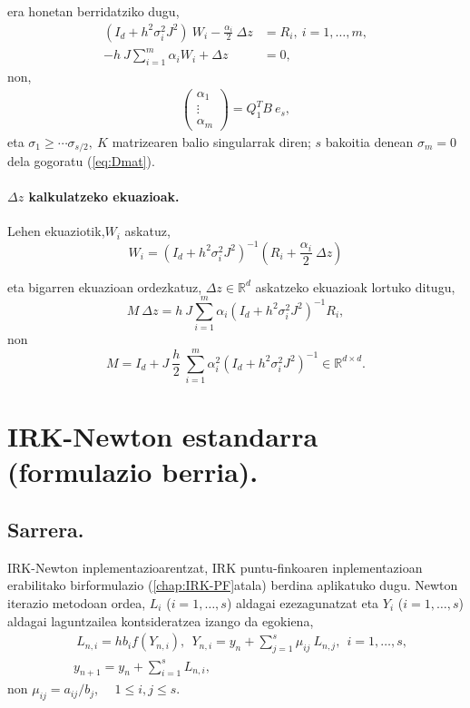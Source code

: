 era honetan berridatziko dugu,
\begin{align*}
(I_d+h^2\sigma_i^2J^2) \ W_i- \frac{\alpha_i}{2}\ \Delta z &=R_i, \ i=1,\dots,m,\\
-h \ J \sum\limits_{i=1}^{m} \alpha_i W_i+\Delta z &=0,
\end{align*}
non,
\begin{align*}
\left(
\begin{matrix}
\alpha_1 \\
\vdots \\
\alpha_m
\end{matrix}
\right)=Q_1^TB \ e_s,
\end{align*}
eta $\sigma_1 \ge \cdots \sigma_{s/2}, \ K$ matrizearen balio singularrak diren; $s$ bakoitia denean $\sigma_m=0$ dela gogoratu (\ref{eq:Dmat}). 

\paragraph*{$\Delta z$ kalkulatzeko ekuazioak.}

Lehen ekuaziotik,$W_i$ askatuz, 
\begin{equation*}
W_i=(I_d+h^2\sigma_i^2J^2)^{-1} (R_i+\frac{\alpha_i}{2} \ \Delta z)
\end{equation*}

eta bigarren ekuazioan ordezkatuz, $\Delta z \in \mathbb{R}^d$ askatzeko ekuazioak lortuko ditugu,
\begin{equation}
M\ \Delta z=h \ J\sum\limits_{i=1}^{m}\alpha_i (I_d+h^2\sigma_i^2J^2)^{-1}R_i,
\end{equation}
non
\begin{equation}M=I_d+ J \ \frac{h}{2}\ \sum\limits_{i=1}^{m} \alpha_i^2 (I_d+h^2 \sigma_i^2 J^2)^{-1} \in \mathbb{R}^{d \times d}.
\end{equation}


\section{IRK-Newton estandarra (formulazio berria).}

\subsection*{Sarrera.}

IRK-Newton inplementazioarentzat, IRK puntu-finkoaren inplementazioan erabilitako birformulazio (\ref{chap:IRK-PF}atala) berdina aplikatuko dugu. Newton iterazio metodoan ordea, $L_i$ ($i=1,\dots,s$) aldagai ezezagunatzat eta $Y_i$ ($i=1,\dots,s$) aldagai laguntzailea kontsideratzea \cite{Olsson2000} izango da egokiena,
\begin{align}
\label{eq:62}
&\ L_{n,i}=hb_if(Y_{n,i}), \ \ Y_{n,i}=y_n+ \sum\limits_{j=1}^{s} \mu_{ij} \ L_{n,j},  \ \ i=1,\dots,s,\\
&y_{n+1}=y_n+\sum\limits_{i=1}^{s} L_{n,i},
\end{align}
non  $\mu_{ij}=a_{ij}/{b_j}$, \ \  $1 \le i,j \le s$.

